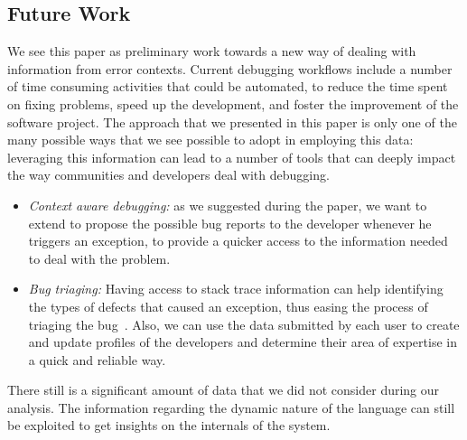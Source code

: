 \subsection{Future Work}

We see this paper as preliminary work towards a new way of dealing with information from error contexts. Current debugging workflows include a number of time consuming activities that could be automated, to reduce the time spent on fixing problems, speed up the development, and foster the improvement of the software project. The approach that we presented in this paper is only one of the many possible ways that we see possible to adopt in employing this data: leveraging this information can lead to a number of tools that can deeply impact the way communities and developers deal with debugging.
\begin{itemize}%
\item\textit{Context aware debugging:} as we suggested during the paper, we want to extend \shr to propose the possible bug reports to the developer whenever he triggers an exception, to provide a quicker access to the information needed to deal with the problem.

\item\textit{Bug triaging:} Having access to stack trace information can help identifying the types of defects that caused an exception, thus easing the process of triaging the bug~\cite{Anvik2006a}. Also, we can use the data submitted by each user to create and update profiles of the developers and determine their area of expertise in a quick and reliable way.

\end{itemize}

There still is a significant amount of data that we did not consider during our analysis. The information regarding the dynamic nature of the language can still be exploited to get insights on the internals of the system.

